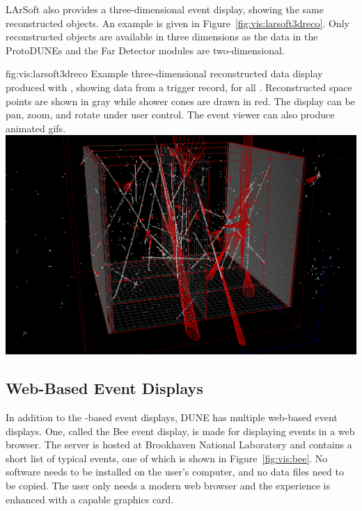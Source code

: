 \documentclass[../main-v1.tex]{subfiles}
\begin{document}
 LArSoft also provides a three-dimensional event display, showing the same reconstructed objects.  An example is given in Figure~\ref{fig:vis:larsoft3dreco}.  Only reconstructed objects are available in three dimensions as the data in the ProtoDUNEs and the Far Detector modules are two-dimensional.
 
\begin{dunefigure}
{fig:vis:larsoft3dreco} 
{Example three-dimensional reconstructed data display produced with , showing data from a  trigger record, for all .  Reconstructed space points are shown in gray while shower cones are drawn in red.  The display can be pan, zoom, and rotate under user control.  The  \threed event viewer can also produce animated gifs.}
\includegraphics[width=0.8 \textwidth]{graphics/EventDisplays/larsoft_reco_evd_3d.png}
\end{dunefigure}

\subsection{Web-Based Event Displays}
\label{sec:visualization:web}

In addition to the -based event displays, DUNE has multiple web-based event displays.  One, called the Bee event display, is made for displaying  events in a web browser.  The server is hosted at Brookhaven National Laboratory and contains a short list of typical  events, one of which is shown in Figure~\ref{fig:vis:bee}. No software needs to be installed on the user's computer, and no data files need to be copied.  The user only needs a modern web browser and the experience is enhanced with a capable graphics card.
\end{document}
